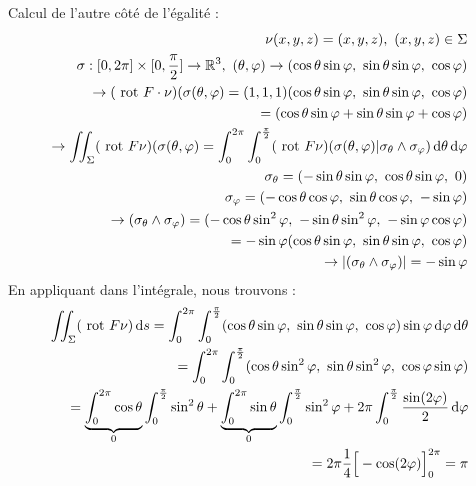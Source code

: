 \documentclass[12pt,a4paper]{article}
\begin{document}
Calcul de l'autre côté de l'égalité :
\begin{align*}
	\nu(x,y,z) = (x,y,z),\ (x,y,z) \in \Sigma\\
	\sigma: [0,2\pi] \times [0,\frac{\pi}{2}] \to \R^3,\ (\theta, \varphi) \to (\cos\theta\sin\varphi,\ \sin\theta\sin\varphi,\ \cos\varphi)\\
	\rightarrow(\rot F \cdot \nu)(\sigma(\theta,\varphi) = (1,1,1) (\cos\theta\sin\varphi,\ \sin\theta\sin\varphi,\ \cos\varphi) \\
	=  (\cos\theta\sin\varphi + \sin\theta\sin\varphi + \cos\varphi)\\
	\to  \iint_\Sigma (\rot F \nu)(\sigma(\theta,\varphi) = \int_0^{2\pi}\int_0^{\frac{\pi}{2}} (\rot F \nu)(\sigma(\theta,\varphi) |\sigma_\theta \wedge \sigma_\varphi) \deriv{\theta}\deriv{\varphi}\\
	 \sigma_\theta = (-\sin\theta\sin\varphi,\ \cos\theta\sin\varphi,\ 0)\\
	 \sigma_\varphi = (-\cos\theta\cos\varphi,\ \sin\theta\cos\varphi,\ -\sin\varphi)\\
	 \to (\sigma_\theta \wedge \sigma_\varphi) = (-\cos\theta\sin^2\varphi,\ -\sin\theta\sin^2\varphi,\ -\sin\varphi\cos\varphi)\\
	 = -\sin\varphi(\cos\theta\sin\varphi,\ \sin\theta\sin\varphi,\ \cos\varphi)\\
	 \to |(\sigma_\theta \wedge \sigma_\varphi)| = -\sin\varphi
\end{align*}
En appliquant dans l'intégrale, nous trouvons :
\begin{align*}
	\iint_\Sigma (\rot F \nu)\deriv{s} = \int_0^{2\pi}\int_0^{\frac{\pi}{2}} (\cos\theta\sin\varphi,\ \sin\theta\sin\varphi,\ \cos\varphi) \sin\varphi \deriv{\varphi}\deriv{\theta}\\
	= \int_0^{2\pi}\int_0^{\frac{\pi}{2}} (\cos\theta\sin^2\varphi,\ \sin\theta\sin^2\varphi,\ \cos\varphi\sin\varphi)\\
	= \underbrace{\int_0^{2\pi}\cos\theta}_0 \int_0^{\frac{\pi}{2}} \sin^2\theta + \underbrace{\int_0^{2\pi}\sin\theta}_0 \int_0^{\frac{\pi}{2}}\sin^2 \varphi + 2\pi \int_0^{\frac{\pi}{2}} \frac{\sin(2\varphi)}{2} \deriv{\varphi}\\
	= 2\pi \frac{1}{4} \Big[-\cos(2\varphi)\Big]_0^{2\pi} = \pi
\end{align*}

\setcounter{section}{13}
\end{document}

